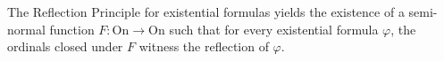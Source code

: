 The Reflection Principle for existential formulas yields the existence of a semi-normal function $F: \mathrm{On} \rightarrow \mathrm{On}$ such that for every existential formula $\varphi$, the ordinals closed under $F$ witness the reflection of $\varphi$.
